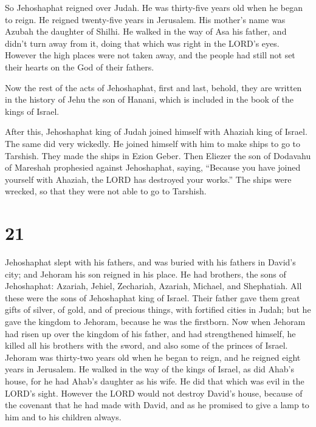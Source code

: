  So Jehoshaphat reigned over Judah. He was thirty-five
years old when he began to reign. He reigned twenty-five years in
Jerusalem. His mother's name was Azubah the daughter of Shilhi.
 He walked in the way of Asa his father, and didn't turn
away from it, doing that which was right in the LORD's eyes.
 However the high places were not taken away, and the
people had still not set their hearts on the God of their fathers.

 Now the rest of the acts of Jehoshaphat, first and last,
behold, they are written in the history of Jehu the son of Hanani, which
is included in the book of the kings of Israel.

 After this, Jehoshaphat king of Judah joined himself
with Ahaziah king of Israel. The same did very wickedly. 
He joined himself with him to make ships to go to Tarshish. They made
the ships in Ezion Geber.  Then Eliezer the son of
Dodavahu of Mareshah prophesied against Jehoshaphat, saying, ``Because
you have joined yourself with Ahaziah, the LORD has destroyed your
works.'' The ships were wrecked, so that they were not able to go to
Tarshish.

\hypertarget{section-20}{%
\section{21}\label{section-20}}

 Jehoshaphat slept with his fathers, and was buried with
his fathers in David's city; and Jehoram his son reigned in his place.
 He had brothers, the sons of Jehoshaphat: Azariah,
Jehiel, Zechariah, Azariah, Michael, and Shephatiah. All these were the
sons of Jehoshaphat king of Israel.  Their father gave
them great gifts of silver, of gold, and of precious things, with
fortified cities in Judah; but he gave the kingdom to Jehoram, because
he was the firstborn.  Now when Jehoram had risen up over
the kingdom of his father, and had strengthened himself, he killed all
his brothers with the sword, and also some of the princes of Israel.
 Jehoram was thirty-two years old when he began to reign,
and he reigned eight years in Jerusalem.  He walked in the
way of the kings of Israel, as did Ahab's house, for he had Ahab's
daughter as his wife. He did that which was evil in the LORD's sight.
 However the LORD would not destroy David's house, because
of the covenant that he had made with David, and as he promised to give
a lamp to him and to his children always.

